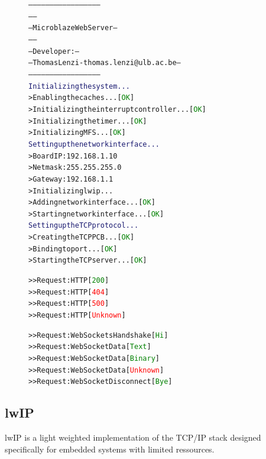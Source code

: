    \begin{figure}[h!]
\begin{alltt}
--------------------------------------------------
--                                              --
--            Microblaze Web Server             --
--                                              --
--    Developer:                                --
--    Thomas Lenzi - thomas.lenzi@ulb.ac.be     --
--------------------------------------------------
\textcolor{MidnightBlue}{Initializing the system...}
> Enabling the caches...                     [\textcolor{Green}{OK}]
> Initializing the interrupt controller...   [\textcolor{Green}{OK}]
> Initializing the timer...                  [\textcolor{Green}{OK}]
> Initializing MFS...                        [\textcolor{Green}{OK}]
\textcolor{MidnightBlue}{Setting up the network interface...}
> Board IP: 192.168.1.10
> Netmask : 255.255.255.0
> Gateway : 192.168.1.1
> Initializing lwip...
> Adding network interface...                [\textcolor{Green}{OK}]
> Starting network interface...              [\textcolor{Green}{OK}]
\textcolor{MidnightBlue}{Setting up the TCP protocol...}
> Creating the TCP PCB...                    [\textcolor{Green}{OK}]
> Binding to port...                         [\textcolor{Green}{OK}]
> Starting the TCP server...                 [\textcolor{Green}{OK}]

>> Request: HTTP                             [\textcolor{Green}{200}]
>> Request: HTTP                             [\textcolor{Red}{404}]
>> Request: HTTP                             [\textcolor{Red}{500}]
>> Request: HTTP                             [\textcolor{Red}{Unknown}]

>> Request: WebSockets Handshake             [\textcolor{Green}{Hi}]
>> Request: WebSocket Data                   [\textcolor{Green}{Text}]
>> Request: WebSocket Data                   [\textcolor{Green}{Binary}]
>> Request: WebSocket Data                   [\textcolor{Red}{Unknown}]
>> Request: WebSocket Disconnect             [\textcolor{Green}{Bye}]
\end{alltt}
      \caption{}
      \label{fig:III-2-microblaze}
    \end{figure}

    \subsection{lwIP}

      lwIP is a light weighted implementation of the TCP/IP stack designed specifically for embedded systems with limited ressources.

